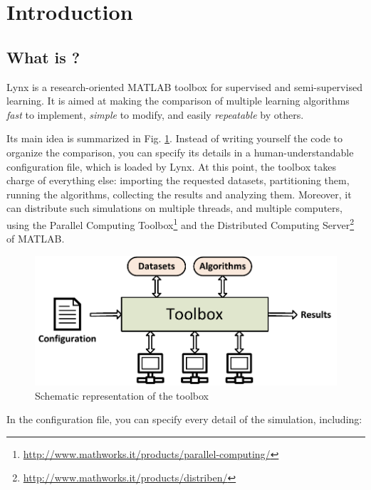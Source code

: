 \chapter*{Introduction}

\section*{What is \toolboxname?}

Lynx is a research-oriented MATLAB toolbox for supervised and semi-supervised learning. It is aimed at making the comparison of multiple learning algorithms \textit{fast} to implement, \textit{simple} to modify, and easily \textit{repeatable} by others.

Its main idea is summarized in Fig. \ref{fig:generalschema}. Instead of writing yourself the code to organize the comparison, you can specify its details in a human-understandable configuration file, which is loaded by Lynx. At this point, the toolbox takes charge of everything else: importing the requested datasets, partitioning them, running the algorithms, collecting the results and analyzing them. Moreover, it can distribute such simulations on multiple threads, and multiple computers, using the Parallel Computing Toolbox\footnote{\url{http://www.mathworks.it/products/parallel-computing/}} and the Distributed Computing Server\footnote{\url{http://www.mathworks.it/products/distriben/}} of MATLAB.

\begin{figure}[t]
\centering
\includegraphics[scale=0.6]{./images/ToolboxSchema}
\caption{Schematic representation of the toolbox}
\label{fig:generalschema}
\end{figure}

In the configuration file, you can specify every detail of the simulation, including:

